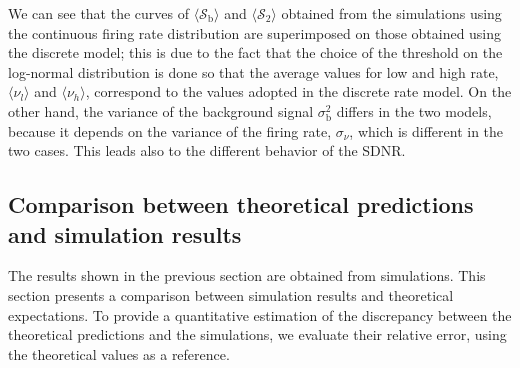 \documentclass[a4paper, 12pt, twoside, openright]{book}
\newcommand{\SII}{\mathcal{S}_\text{2}}
\newcommand{\Sb}{\mathcal{S}_\text{b}}
\newcommand{\varSb}{\sigma^{2}_\text{b}}
\begin{document}
We can see that the curves of $\langle\Sb\rangle$ and $\langle\SII\rangle$ obtained from the simulations using the continuous firing rate distribution are superimposed
on those obtained using the discrete model; this is due to the fact that the choice of the threshold on the log-normal distribution is done so that the average values for low and high rate, $\langle \nu_l \rangle$ and 
$\langle \nu_h \rangle$, correspond to the values adopted in the discrete rate model.
On the other hand, the variance of the background signal $\varSb$ differs in the two models, because it depends on the variance of the firing rate,
$\sigma_\nu$, which is different in the two cases.
This leads also to the different behavior of the SDNR.

\subsection{Comparison between theoretical predictions
and simulation results}
The results shown in the previous section are obtained from simulations. This section presents a comparison between simulation results and theoretical expectations.
To provide a quantitative estimation of the discrepancy between the theoretical predictions and the simulations, we evaluate their relative error, using the theoretical values as a reference.
\end{document}
